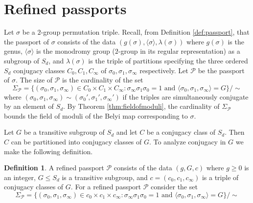\documentclass{dcthesis}
\newcommand{\defi}[1]{\textsf{#1}}
\numberwithin{equation}{section}
\theoremstyle{definition}
\newtheorem{definition}[equation]{Definition}
\theoremstyle{remark}
\begin{document}
{{  \section{Refined passports}{\label{sec:refined}}{
    Let $\sigma$ be a $2$-group permutation triple.
    Recall, from Definition \ref{def:passport},
    that the passport of $\sigma$
    consists of the data
    $(g(\sigma), \langle\sigma\rangle,
    \lambda(\sigma))$
    where $g(\sigma)$ is the genus,
    $\langle\sigma\rangle$ is the monodromy
    group
    ($2$-group in its regular
    representation)
    as a subgroup of $S_d$,
    and $\lambda(\sigma)$ is the
    triple of partitions
    specifying the three ordered
    $S_d$
    conjugacy classes
    $C_0,C_1,C_\infty$
    of
    $\sigma_0,\sigma_1,\sigma_\infty$
    respectively.
    Let $\mathcal{P}$ be the passport
    of $\sigma$.
    The size of
    $\mathcal{P}$
    is the cardinality of the set
    \begin{equation}
      \label{eqn:coarse}
      \Sigma_\mathcal{P}
      =
      \{
        (\sigma_0,\sigma_1,\sigma_\infty)\in
        C_0\times C_1\times C_\infty:
        \sigma_\infty\sigma_1\sigma_0=1
        \text{ and }
        \langle\sigma_0,\sigma_1,\sigma_\infty\rangle=G
      \}/\sim
    \end{equation}
    where
    $(\sigma_0,\sigma_1,\sigma_\infty)\sim
    (\sigma_0',\sigma_1',\sigma_\infty')$
    if the triples are simultaneously conjugate
    by an element of $S_d$.
    By Theorem \ref{thm:fieldofmoduli},
    the cardinality of $\Sigma_\mathcal{P}$
    bounds the field of moduli of
    the Belyi map corresponding to $\sigma$.
    \par
    Let $G$ be a transitive subgroup of $S_d$
    and let $C$ be a conjugacy class of $S_d$.
    Then $C$ can be partitioned into
    conjugacy classes of $G$.
    To analyze conjugacy in $G$ we
    make the following definition.
    \begin{definition}\label{def:refined}
      A \defi{refined passport} $\mathscr{P}$
      consists of the data
      $(g,G,c)$
      where $g\geq 0$ is an integer,
      $G\leq S_d$ is a transitive subgroup,
      and $c = (c_0,c_1,c_\infty)$
      is a triple of conjugacy classes of $G$.
      For a refined passport
      $\mathscr{P}$ consider the set
      \begin{equation}
        \label{eqn:refined}
        \Sigma_\mathscr{P} =
        \{(\sigma_0,\sigma_1,\sigma_\infty)\in c_0\times c_1\times c_\infty : \sigma_\infty\sigma_1\sigma_0=1\text{ and } \langle\sigma_0,\sigma_1,\sigma_\infty\rangle=G\}/\sim

\end{equation}
\end{definition}}}}
\end{document}
